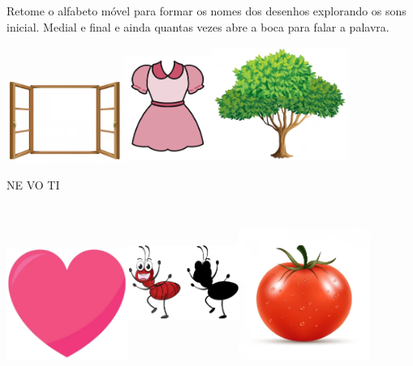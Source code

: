 Retome o alfabeto móvel para formar os nomes dos desenhos explorando
os sons inicial. Medial e final e ainda quantas vezes abre a boca para
falar a palavra.

\includegraphics[width=1.50139in,height=1.07153in]{media/image64.png}\includegraphics[width=1.12986in,height=1.39097in]{media/image65.png}\includegraphics[width=1.74752in,height=1.49479in]{media/image66.png}

NE VO TI

\includegraphics[width=1.56319in,height=1.45278in]{media/image67.png}\includegraphics[width=1.42083in,height=1.99583in]{media/image68.png}\includegraphics[width=1.67778in,height=1.67778in]{media/image69.png}

